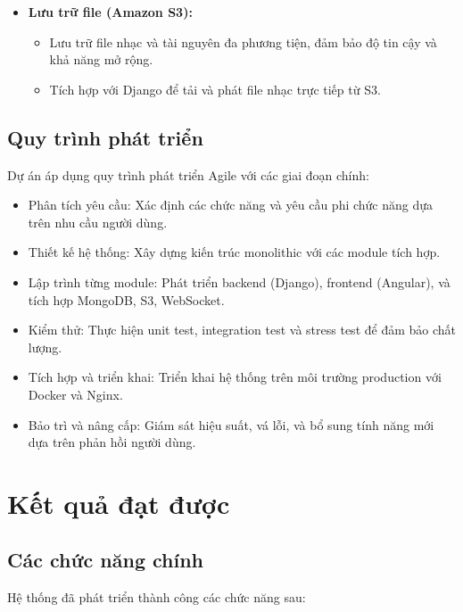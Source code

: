 \documentclass[a4paper,12pt]{report}
\begin{document}
\begin{itemize}
    \item \textbf{Lưu trữ file (Amazon S3):}
        \begin{itemize}
            \item Lưu trữ file nhạc và tài nguyên đa phương tiện, đảm bảo độ tin cậy và khả năng mở rộng.
            \item Tích hợp với Django để tải và phát file nhạc trực tiếp từ S3.
        \end{itemize}
\end{itemize}

\section{Quy trình phát triển}
Dự án áp dụng quy trình phát triển Agile với các giai đoạn chính:

\begin{itemize}
    \item Phân tích yêu cầu: Xác định các chức năng và yêu cầu phi chức năng dựa trên nhu cầu người dùng.
    \item Thiết kế hệ thống: Xây dựng kiến trúc monolithic với các module tích hợp.
    \item Lập trình từng module: Phát triển backend (Django), frontend (Angular), và tích hợp MongoDB, S3, WebSocket.
    \item Kiểm thử: Thực hiện unit test, integration test và stress test để đảm bảo chất lượng.
    \item Tích hợp và triển khai: Triển khai hệ thống trên môi trường production với Docker và Nginx.
    \item Bảo trì và nâng cấp: Giám sát hiệu suất, vá lỗi, và bổ sung tính năng mới dựa trên phản hồi người dùng.
\end{itemize}

\chapter{Kết quả đạt được}

\section{Các chức năng chính}
Hệ thống đã phát triển thành công các chức năng sau:
\end{document}
